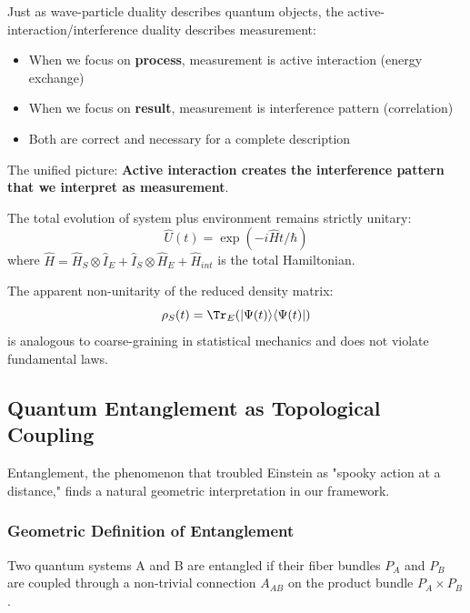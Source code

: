 \begin{insight}
Just as wave-particle duality describes quantum objects, the active-interaction/interference duality describes measurement:
\begin{itemize}
    \item When we focus on \textbf{process}, measurement is active interaction (energy exchange)
    \item When we focus on \textbf{result}, measurement is interference pattern (correlation)
    \item Both are correct and necessary for a complete description
\end{itemize}
The unified picture: \textbf{Active interaction creates the interference pattern that we interpret as measurement}.
\end{insight}

\begin{theorem}
The total evolution of system plus environment remains strictly unitary:
\begin{equation}
    \hat{U}(t) = \exp(-i\hat{H}t/\hbar)
\end{equation}
where $\hat{H} = \hat{H}_S \otimes \hat{I}_E + \hat{I}_S \otimes \hat{H}_E + \hat{H}_{int}$ is the total Hamiltonian.
\end{theorem}

The apparent non-unitarity of the reduced density matrix:
\begin{equation}
    \rho_S(t) = \Tr_E(|\Psi(t)\rangle\langle\Psi(t)|)
\end{equation}
is analogous to coarse-graining in statistical mechanics and does not violate fundamental laws.

\subsection{Quantum Entanglement as Topological Coupling}

Entanglement, the phenomenon that troubled Einstein as "spooky action at a distance," finds a natural geometric interpretation in our framework.

\subsubsection{Geometric Definition of Entanglement}

\begin{definition}
Two quantum systems A and B are entangled if their fiber bundles $P_A$ and $P_B$ are coupled through a non-trivial connection $A_{AB}$ on the product bundle $P_A \times P_B$.
\end{definition}

